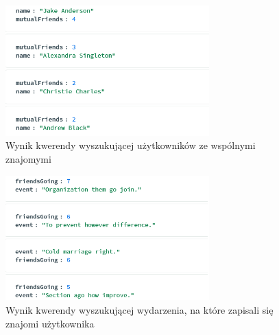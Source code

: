 \documentclass{article}
\begin{document}
\begin{figure}[H]
    \centering
    \includegraphics[width=0.7\textwidth]{docs/images/mutual_friends_nosql.png}
    \caption{Wynik kwerendy wyszukującej użytkowników ze wspólnymi znajomymi}
    \label{fig:nosql_1}
\end{figure}

\begin{figure}[H]
    \centering
    \includegraphics[width=0.7\textwidth]{docs/images/events_with_your_friends_nosql.png}
    \caption{Wynik kwerendy wyszukującej wydarzenia, na które zapisali się znajomi użytkownika}
    \label{fig:nosql_2}
\end{figure}




\end{document}
